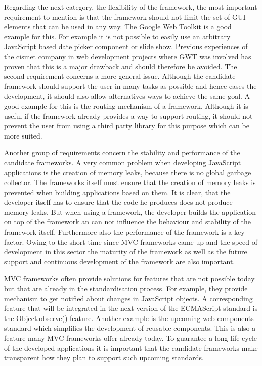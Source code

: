 Regarding the next category, the flexibility of the framework, the most important requirement to mention is that the framework should not limit the set of GUI elements that can be used in any way.
The Google Web Toolkit \autocite{conception:gwt} is a good example for this.
For example it is not possible to easily use an arbitrary JavaScript based date picker component or slide show.
Previous experiences of the cismet company in web development projects where GWT was involved has proven that this is a major drawback and should therefore be avoided.
The second requirement concerns a more general issue.
Although the candidate framework should support the user in many tasks as possible and hence eases the development, it should also allow alternatives ways to achieve the same goal.
A good example for this is the routing mechanism of a framework.
Although it is useful if the framework already provides a way to support routing, it should not prevent the user from using a third party library for this purpose which can be more suited.

Another group of requirements concern the stability and performance of the candidate frameworks.
A very common problem when developing JavaScript applications is the creation of memory leaks, because there is no global garbage collector.
The frameworks itself must ensure that the creation of memory leaks is prevented when building applications based on them. It is clear, that the developer itself has to ensure that the code he produces does not produce memory leaks. But when using a framework, the developer builds the application on top of the framework an can not influence the behaviour and stability of the framework itself.
Furthermore also the performance of the framework is a key factor.
Owing to the short time since MVC frameworks came up and the speed of development in this sector the maturity of the framework as well as the future support and continuous development of the framework are also important.

MVC frameworks often provide solutions for features that are not possible today but that are already in the standardisation process.
For example, they provide mechanism to get notified about changes in JavaScript objects.
A corresponding feature that will be integrated in the next version of the ECMAScript standard is the Object.observe() feature.
Another example is the upcoming web components standard which simplifies the development of reusable components.
This is also a feature many MVC frameworks offer already today.
To guarantee a long life-cycle of the developed applications it is important that the candidate frameworks make transparent how they plan to support such upcoming standards.
 
